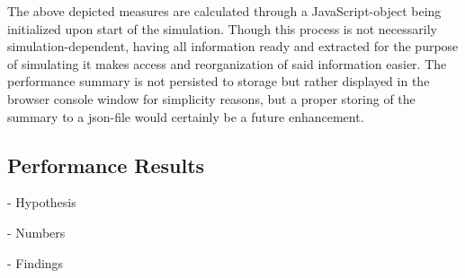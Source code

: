 The above depicted measures are calculated through a JavaScript-object being initialized upon start of the simulation. Though this process is not necessarily simulation-dependent, having all information ready and extracted for the purpose of simulating it makes access and reorganization of said information easier. The performance summary is not persisted to storage but rather displayed in the browser console window for simplicity reasons, but a proper storing of the summary to a json-file would certainly be a future enhancement. 


\subsection{Performance Results}


- Hypothesis

- Numbers

- Findings
